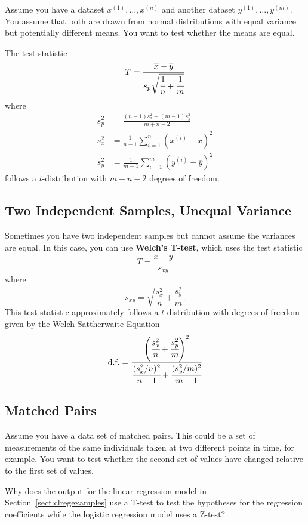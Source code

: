 Assume you have a dataset $x^{(1)}, \dots, x^{(n)}$ and another dataset $y^{(1)}, \dots, y^{(m)}$. You assume that both are drawn from normal distributions with equal variance but potentially different means. You want to test whether the means are equal.

The test statistic
$$ T = \frac{\overline{x} - \overline{y}}{s_p \sqrt{\cfrac{1}{n} + \cfrac{1}{m}}} $$
where
\begin{align*} s_p^2 &= \frac{(n-1) s_x^2 + (m-1) s_y^2}{m + n - 2} \\
s_x^2 &= \frac{1}{n-1} \sum_{i=1}^n (x^{(i)} - \overline{x})^2 \\
s_y^2 &= \frac{1}{m-1} \sum_{i=1}^m (y^{(i)} - \overline{y})^2 \end{align*}
follows a $t$-distribution with $m + n - 2$ degrees of freedom.

\subsection{Two Independent Samples, Unequal Variance}

Sometimes you have two independent samples but cannot assume the variances are equal. In this case, you can use \textbf{Welch's T-test}, which uses the test statistic
$$ T = \frac{\overline{x} - \overline{y}}{s_{xy}} $$
where 
$$ s_{xy} = \sqrt{\frac{s_x^2}{n} + \frac{s_y^2}{m}}. $$
This test statistic approximately follows a $t$-distribution with degrees of freedom given by the {Welch-Sattherwaite Equation}
$$ \text{d.f.} = \frac{\left(\cfrac{s_x^2}{n} + \cfrac{s_y^2}{m} \right)^2}{\cfrac{(s_x^2/n)^2}{n-1} + \cfrac{(s_y^2/m)^2}{m-1}} $$ 

\subsection{Matched Pairs}

Assume you have a data set of matched pairs. This could be a set of measurements of the same individuals taken at two different points in time, for example. You want to test whether the second set of values have changed relative to the first set of values.

\begin{question}{}
Why does the output for the linear regression model in Section~\ref{sect:clregexamples} use a T-test to test the hypotheses for the regression coefficients while the logistic regression model uses a Z-test?
\end{question}


